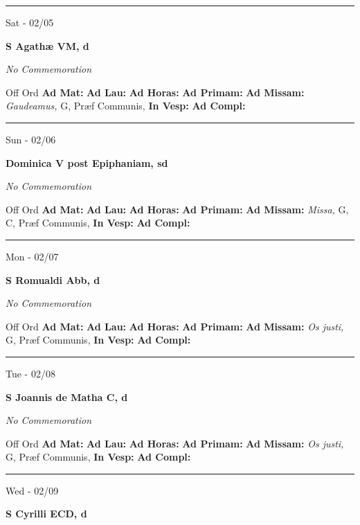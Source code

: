 \documentclass[letterpaper, 10pt]{article}
\begin{document}
\hrule
\begin{center}
Sat - 02/05
\end{center}\textbf{ \large S Agathæ VM, \textnormal{\normalsize d}}

\textit{No Commemoration}\begin{justify}
Off Ord
\textbf{Ad Mat: }
\textbf{Ad Lau: }
\textbf{Ad Horas: }
\textbf{Ad Primam: }
\textbf{Ad Missam:} \textit{Gaudeamus, } G, Præf Communis, 
\textbf{In Vesp: }
\textbf{Ad Compl: }\end{justify}



\hrule
\begin{center}
Sun - 02/06
\end{center}\textbf{ \large Dominica V post Epiphaniam, \textnormal{\normalsize sd}}

\textit{No Commemoration}\begin{justify}
Off Ord
\textbf{Ad Mat: }
\textbf{Ad Lau: }
\textbf{Ad Horas: }
\textbf{Ad Primam: }
\textbf{Ad Missam:} \textit{Missa, } G, C, Præf Communis, 
\textbf{In Vesp: }
\textbf{Ad Compl: }\end{justify}



\hrule
\begin{center}
Mon - 02/07
\end{center}\textbf{ \large S Romualdi Abb, \textnormal{\normalsize d}}

\textit{No Commemoration}\begin{justify}
Off Ord
\textbf{Ad Mat: }
\textbf{Ad Lau: }
\textbf{Ad Horas: }
\textbf{Ad Primam: }
\textbf{Ad Missam:} \textit{Os justi, } G, Præf Communis, 
\textbf{In Vesp: }
\textbf{Ad Compl: }\end{justify}



\hrule
\begin{center}
Tue - 02/08
\end{center}\textbf{ \large S Joannis de Matha C, \textnormal{\normalsize d}}

\textit{No Commemoration}\begin{justify}
Off Ord
\textbf{Ad Mat: }
\textbf{Ad Lau: }
\textbf{Ad Horas: }
\textbf{Ad Primam: }
\textbf{Ad Missam:} \textit{Os justi, } G, Præf Communis, 
\textbf{In Vesp: }
\textbf{Ad Compl: }\end{justify}



\hrule
\begin{center}
Wed - 02/09
\end{center}\textbf{ \large S Cyrilli ECD, \textnormal{\normalsize d}}
\end{document}
